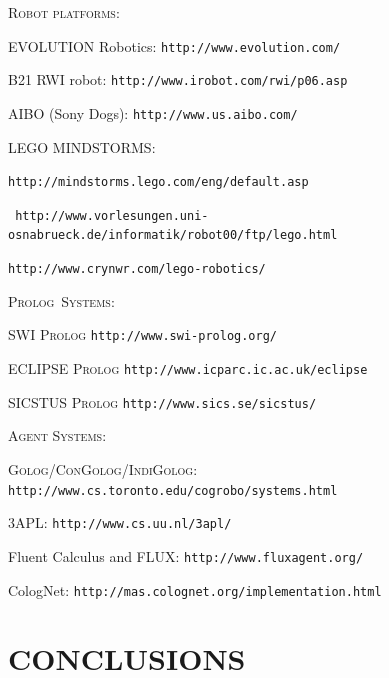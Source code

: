 \documentclass[11pt]{article}
\newcommand{\IndiGolog}{\mbox{\textsc{IndiGolog}}}
\newcommand{\Golog}{\mbox{\textsc{Golog}}}
\newcommand{\ConGolog}{\mbox{\textsc{ConGolog}}}
\newcommand{\Prolog}{\mbox{\textsc{Prolog}}}
\begin{document}
\begin{description}
\item \textsc{Robot platforms:}

	EVOLUTION Robotics: \texttt{http://www.evolution.com/}

	B21 RWI robot: \texttt{http://www.irobot.com/rwi/p06.asp}

	AIBO (Sony Dogs): \texttt{http://www.us.aibo.com/}

	LEGO MINDSTORMS:

	\hspace{1cm}
	\texttt{http://mindstorms.lego.com/eng/default.asp}

	\hspace{1cm}
	\texttt{ 
	http://www.vorlesungen.uni-osnabrueck.de/informatik/robot00/ftp/lego.html}

	\hspace{1cm}
	\texttt{http://www.crynwr.com/lego-robotics/}



\item \textsc{\Prolog\ Systems:}

SWI \Prolog\: \texttt{http://www.swi-prolog.org/}

ECLIPSE \Prolog\: \texttt{http://www.icparc.ic.ac.uk/eclipse}

SICSTUS \Prolog\: \texttt{http://www.sics.se/sicstus/}

\item \textsc{Agent Systems:}

\Golog/\ConGolog/\IndiGolog:
\texttt{http://www.cs.toronto.edu/cogrobo/systems.html}

3APL:
\texttt{http://www.cs.uu.nl/3apl/}

Fluent Calculus and FLUX:
\texttt{http://www.fluxagent.org/}

CologNet:
\texttt{http://mas.colognet.org/implementation.html}
\end{description}




\section{CONCLUSIONS} \label{sec:conclusions}




\end{document}
